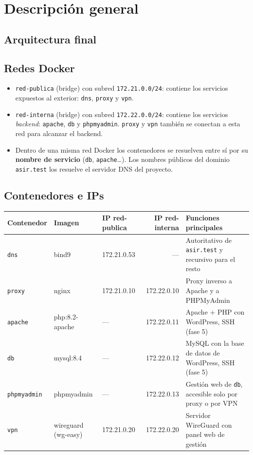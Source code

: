 \documentclass[11pt]{article}
\author{alvaro}
\date{\today}
\title{}
\begin{document}
\tableofcontents

\section{Descripción general}
\label{sec:org000000f}

\subsection{Arquitectura final}
\label{sec:org0000000}

\begin{center}

\label{}
\end{center}
\subsection{Redes Docker}
\label{sec:org0000003}
\begin{itemize}
\item \texttt{red-publica} (bridge) con subred \texttt{172.21.0.0/24}: contiene los servicios expuestos al exterior: \texttt{dns}, \texttt{proxy} y \texttt{vpn}.
\item \texttt{red-interna} (bridge) con subred \texttt{172.22.0.0/24}: contiene los servicios \emph{backend}: \texttt{apache}, \texttt{db} y \texttt{phpmyadmin}. \texttt{proxy} y \texttt{vpn} también se conectan a esta red para alcanzar el backend.
\item Dentro de una misma red Docker los contenedores se resuelven entre sí por su \textbf{nombre de servicio} (\texttt{db}, \texttt{apache}\ldots{}). Los nombres públicos del dominio \texttt{asir.test} los resuelve el servidor DNS del proyecto.
\end{itemize}
\subsection{Contenedores e IPs}
\label{sec:org0000006}

\begin{center}
\begin{tabular}{lllrl}
Contenedor & Imagen & IP red-publica & IP red-interna & Funciones principales\\
\hline
\texttt{dns} & bind9 & 172.21.0.53 & — & Autoritativo de \texttt{asir.test} y recursivo para el resto\\
\texttt{proxy} & nginx & 172.21.0.10 & 172.22.0.10 & Proxy inverso a Apache y a PHPMyAdmin\\
\texttt{apache} & php:8.2-apache & — & 172.22.0.11 & Apache + PHP con WordPress, SSH (fase 5)\\
\texttt{db} & mysql:8.4 & — & 172.22.0.12 & MySQL con la base de datos de WordPress, SSH (fase 5)\\
\texttt{phpmyadmin} & phpmyadmin & — & 172.22.0.13 & Gestión web de \texttt{db}, accesible solo por proxy o por VPN\\
\texttt{vpn} & wireguard (wg-easy) & 172.21.0.20 & 172.22.0.20 & Servidor WireGuard con panel web de gestión\\
\end{tabular}
\end{center}
\end{document}
